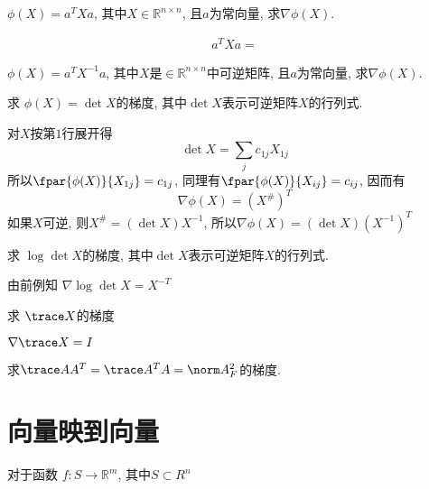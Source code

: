 \documentclass{ctexbook}
\begin{document}
\begin{example}
$\phi(X) = a^TXa$, 其中$ X\in \mathbb R^{n\times n}$, 且$a$为常向量, 求$\nabla \phi(X)$.	
\end{example}
\begin{mulsol}
\begin{align*}
  a^TXa = 
\end{align*}
\end{mulsol}



\begin{example}
$\phi(X) = a^TX^{-1}a$, 其中$ X$是$\in \mathbb R^{n\times n}$中可逆矩阵, 且$a$为常向量, 求$\nabla \phi(X)$.	
\end{example}

\begin{example}
	求 $\phi(X)=\det X$的梯度, 其中$\det X$表示可逆矩阵$X$的行列式.
	\begin{mulsol}
		对$X$按第$1$行展开得
		\begin{equation*}
  \det X = \sum_j c_{1j} X_{1j}
\end{equation*}
所以$\fpar{\phi (X)}{X_{1j}} = c_{1j}$, 同理有$\fpar{\phi (X)}{X_{ij}} = c_{ij}$, 因而有
\begin{equation*}
  \nabla \phi (X) = (X^{\#})^T  
\end{equation*}
如果$X$可逆, 则$X^\# =(\det X) X^{-1}$,  所以$\nabla \phi(X) = (\det X) (X^{-1})^T$
	\end{mulsol}
\end{example}

\begin{example}
	求 $\log\det X$的梯度, 其中$\det X$表示可逆矩阵$X$的行列式. 
\end{example}
\begin{solution}
由前例知 	$\nabla \log\det X= X^{-T}$
\end{solution}

\begin{example}
	求 $\trace X$的梯度
	\begin{solution}
		$\nabla \trace X = I $
	\end{solution}
\end{example}

\begin{example}
	求$\trace AA^T = \trace A^TA = \norm A_F^2 $的梯度.
\end{example}


\section{向量映到向量}
对于函数 $f:S\rightarrow \mathbb R^m$, 其中$S\subset R^n$
\end{document}
